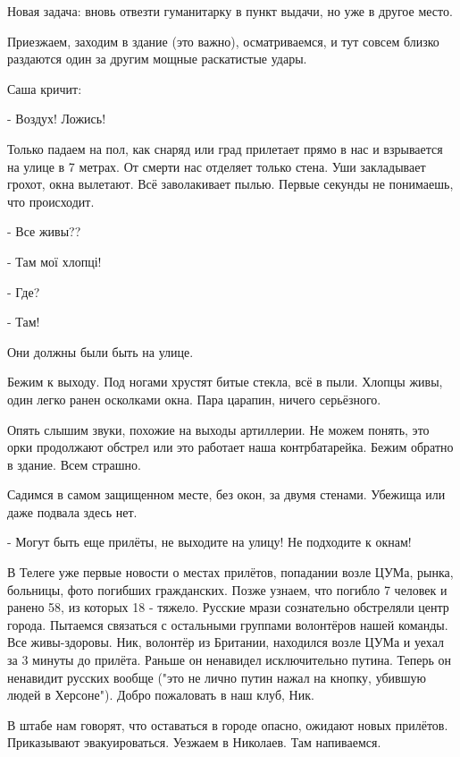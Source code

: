 Новая задача: вновь отвезти гуманитарку в пункт выдачи, но уже в другое место.

Приезжаем, заходим в здание (это важно), осматриваемся, и тут совсем близко
раздаются один за другим мощные раскатистые удары.

Саша кричит:

- Воздух! Ложись!

Только падаем на пол, как снаряд или град прилетает прямо в нас и взрывается на
улице в 7 метрах. От смерти нас отделяет только стена. Уши закладывает грохот,
окна вылетают. Всё заволакивает пылью. Первые секунды не понимаешь, что
происходит.

- Все живы??

- Там мої хлопці!

- Где?

- Там!

Они должны были быть на улице.

Бежим к выходу. Под ногами хрустят битые стекла, всё в пыли. Хлопцы живы, один
легко ранен осколками окна. Пара царапин, ничего серьёзного.

Опять слышим звуки, похожие на выходы артиллерии. Не можем понять, это орки
продолжают обстрел или это работает наша контрбатарейка. Бежим обратно в
здание. Всем страшно.

Садимся в самом защищенном месте, без окон, за двумя стенами. Убежища или даже
подвала здесь нет.

- Могут быть еще прилёты, не выходите на улицу! Не подходите к окнам!

В Телеге уже первые новости о местах прилётов, попадании возле ЦУМа, рынка,
больницы, фото погибших гражданских. Позже узнаем, что погибло 7 человек и
ранено 58, из которых 18 - тяжело. Русские мрази сознательно обстреляли центр
города. Пытаемся связаться с остальными группами волонтёров нашей команды. Все
живы-здоровы. Ник, волонтёр из Британии, находился возле ЦУМа и уехал за 3
минуты до прилёта. Раньше он ненавидел исключительно путина. Теперь он
ненавидит русских вообще ("это не лично путин нажал на кнопку, убившую людей в
Херсоне"). Добро пожаловать в наш клуб, Ник.

В штабе нам говорят, что оставаться в городе опасно, ожидают новых прилётов.
Приказывают эвакуироваться. Уезжаем в Николаев. Там напиваемся.
